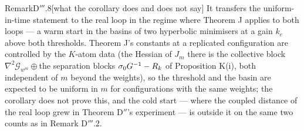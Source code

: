 \begin{rmk}{Remark}{D$'''$.8}[what the corollary does and does not say]
It transfers the uniform-in-time statement to the real loop in the regime where Theorem J applies to both loops ---
a warm start in the basins of two hyperbolic minimisers at a gain $k_e$ above both thresholds. Theorem J's constants
at a replicated configuration are controlled by the $K$-atom data (the Hessian of $J_m$ there is the collective block
$\nabla^2\mathcal{G}_{w^m}\oplus{}$the separation blocks $\sigma_0G^{-1} - R_k$ of Proposition K(i), both independent
of $m$ beyond the weights), so the threshold and the basin are expected to be uniform in $m$ for configurations with
the same weights; the corollary does not prove this, and the cold start --- where the coupled distance of the real
loop grew in Theorem D$''$'s experiment --- is outside it on the same two counts as in Remark D$'''$.2.
\end{rmk}

